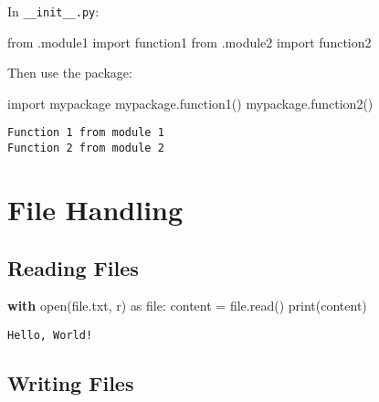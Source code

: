 \documentclass[
  letterpaper,
  DIV=11,
  numbers=noendperiod]{scrreprt}
\newenvironment{Shaded}{\begin{snugshade}}{\end{snugshade}}
\newcommand{\BuiltInTok}[1]{\textcolor[rgb]{0.00,0.23,0.31}{#1}}
\newcommand{\ControlFlowTok}[1]{\textcolor[rgb]{0.00,0.23,0.31}{\textbf{#1}}}
\newcommand{\ImportTok}[1]{\textcolor[rgb]{0.00,0.46,0.62}{#1}}
\newcommand{\NormalTok}[1]{\textcolor[rgb]{0.00,0.23,0.31}{#1}}
\newcommand{\OperatorTok}[1]{\textcolor[rgb]{0.37,0.37,0.37}{#1}}
\newcommand{\StringTok}[1]{\textcolor[rgb]{0.13,0.47,0.30}{#1}}
\begin{document}
In \texttt{\_\_init\_\_.py}:

\begin{Shaded}
\begin{Highlighting}[]
\ImportTok{from}\NormalTok{ .module1 }\ImportTok{import}\NormalTok{ function1}
\ImportTok{from}\NormalTok{ .module2 }\ImportTok{import}\NormalTok{ function2}
\end{Highlighting}
\end{Shaded}

Then use the package:

\begin{Shaded}
\begin{Highlighting}[]
\ImportTok{import}\NormalTok{ mypackage}
\NormalTok{mypackage.function1()}
\NormalTok{mypackage.function2()}
\end{Highlighting}
\end{Shaded}

\begin{verbatim}
Function 1 from module 1
Function 2 from module 2
\end{verbatim}

\section{File Handling}\label{file-handling}

\subsection{Reading Files}\label{reading-files}

\begin{Shaded}
\begin{Highlighting}[]
\ControlFlowTok{with} \BuiltInTok{open}\NormalTok{(}\StringTok{\textquotesingle{}file.txt\textquotesingle{}}\NormalTok{, }\StringTok{\textquotesingle{}r\textquotesingle{}}\NormalTok{) }\ImportTok{as} \BuiltInTok{file}\NormalTok{:}
\NormalTok{    content }\OperatorTok{=} \BuiltInTok{file}\NormalTok{.read()}
    \BuiltInTok{print}\NormalTok{(content)}
\end{Highlighting}
\end{Shaded}

\begin{verbatim}
Hello, World!
\end{verbatim}

\subsection{Writing Files}\label{writing-files}
\end{document}
